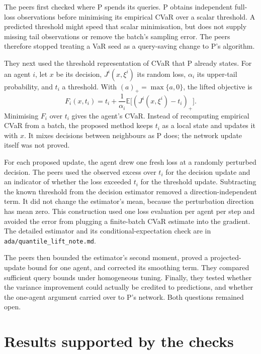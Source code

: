\documentclass{article}
\begin{document}
The peers first checked where P spends its queries. P obtains independent full-loss observations before
minimising its empirical CVaR over a scalar threshold. A predicted threshold might speed that scalar
minimisation, but does not supply missing tail observations or remove the batch's sampling error. The
peers therefore stopped treating a VaR seed as a query-saving change to P's algorithm.

They next used the threshold representation of CVaR that P already states. For an agent \(i\), let \(x\)
be its decision, \(J^i(x,\xi^i)\) its random loss, \(\alpha_i\) its upper-tail probability, and \(t_i\) a
threshold. With \((a)_+=\max\{a,0\}\), the lifted objective is
\[
F_i(x,t_i)=t_i+\frac{1}{\alpha_i}
\mathbb E\bigl[(J^i(x,\xi^i)-t_i)_+\bigr].
\]
Minimising \(F_i\) over \(t_i\) gives the agent's CVaR. Instead of recomputing empirical CVaR from a
batch, the proposed method keeps \(t_i\) as a local state and updates it with \(x\). It mixes decisions
between neighbours as P does; the network update itself was not proved.

For each proposed update, the agent drew one fresh loss at a randomly perturbed decision. The peers used
the observed excess over \(t_i\) for the decision update and an indicator of whether the loss exceeded
\(t_i\) for the threshold update. Subtracting the known threshold from the decision estimator removed a
direction-independent term. It did not change the estimator's mean, because the perturbation direction
has mean zero. This construction used one loss evaluation per agent per step and avoided the error from
plugging a finite-batch CVaR estimate into the gradient. The detailed estimator and its
conditional-expectation check are in \texttt{ada/quantile\_lift\_note.md}.

The peers then bounded the estimator's second moment, proved a projected-update bound for one agent, and
corrected its smoothing term. They compared sufficient query bounds under homogeneous tuning. Finally,
they tested whether the variance improvement could actually be credited to predictions, and whether the
one-agent argument carried over to P's network. Both questions remained open.

\section{Results supported by the checks}
\end{document}
